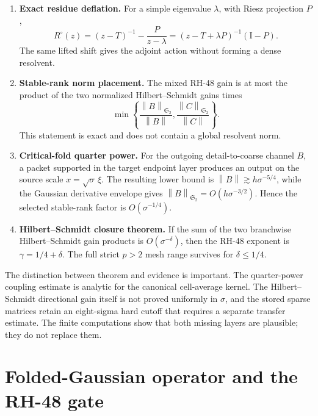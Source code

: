 \documentclass[11pt]{article}
\theoremstyle{definition}
\theoremstyle{remark}
\newcommand{\Id}{\mathrm I}
\newcommand{\HS}{\mathfrak S_2}
\newcommand{\norm}[1]{\left\lVert #1\right\rVert}
\begin{document}
\begin{enumerate}[leftmargin=2.2em]
 \item \textbf{Exact residue deflation.}
 For a simple eigenvalue \(\lambda\), with Riesz projection \(P\),
 \[
  R^\circ(z)
  =(z-T)^{-1}-\frac{P}{z-\lambda}
  =(z-T+\lambda P)^{-1}(\Id-P).
 \]
 The same lifted shift gives the adjoint action without forming a dense
 resolvent.

 \item \textbf{Stable-rank norm placement.}
 The mixed RH-48 gain is at most the product of the two normalized
 Hilbert--Schmidt gains times
 \[
  \min\left\{\frac{\norm B_{\HS}}{\norm B},
               \frac{\norm C_{\HS}}{\norm C}\right\}.
 \]
 This statement is exact and does not contain a global resolvent norm.

 \item \textbf{Critical-fold quarter power.}
 For the outgoing detail-to-coarse channel \(B\), a packet supported in the
 target endpoint layer produces an output on the source scale
 \(x=\sqrt\sigma\,\xi\).  The resulting lower bound is
 \(\norm B\gtrsim h\sigma^{-5/4}\), while the Gaussian derivative envelope
 gives \(\norm B_{\HS}=O(h\sigma^{-3/2})\).  Hence the selected stable-rank
 factor is \(O(\sigma^{-1/4})\).

 \item \textbf{Hilbert--Schmidt closure theorem.}
 If the sum of the two branchwise Hilbert--Schmidt gain products is
 \(O(\sigma^{-\delta})\), then the RH-48 exponent is
 \(\gamma=1/4+\delta\).  The full strict \(p>2\) mesh range survives for
 \(\delta\le1/4\).
\end{enumerate}

The distinction between theorem and evidence is important.  The
quarter-power coupling estimate is analytic for the canonical cell-average
kernel.  The Hilbert--Schmidt directional gain itself is not proved uniformly
in \(\sigma\), and the stored sparse matrices retain an eight-sigma hard
cutoff that requires a separate transfer estimate.  The finite computations
show that both missing layers are plausible; they do not replace them.

\section{Folded-Gaussian operator and the RH-48 gate}
\label{sec:setup}
\end{document}
